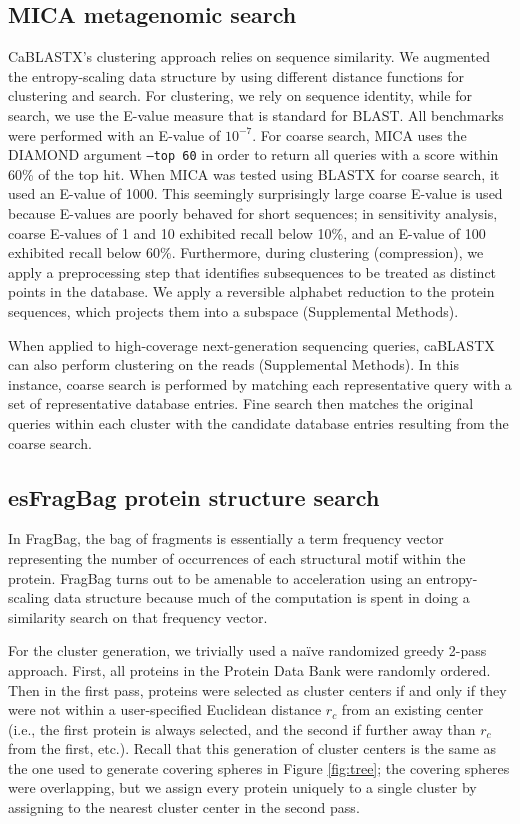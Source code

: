 \documentclass[review,preprint,12pt]{elsarticle}
\theoremstyle{definition}
\theoremstyle{remark}
\numberwithin{equation}{section}
\begin{document}
\subsection{MICA metagenomic search}
CaBLASTX's clustering approach relies on sequence similarity.
We augmented the entropy-scaling data structure by using
different distance functions for clustering and search.
For clustering, we rely on sequence identity, while for search, we use the
E-value measure that is standard for BLAST.
All benchmarks were performed with an E-value of $10^{-7}$. For coarse search, MICA uses the DIAMOND argument \texttt{--top 60} in order to return all queries
with a score within 60\% of the top hit.
When MICA was tested using BLASTX for coarse search, it used an E-value of 
1000.
This seemingly surprisingly large coarse E-value is used because E-values are poorly behaved for short sequences; in sensitivity analysis, coarse E-values of 1 and 10 exhibited recall below 10\%, and an E-value of 100 exhibited recall below 60\%.
Furthermore, during clustering (compression), we apply a preprocessing step that
identifies subsequences to be treated as distinct points in the database.
We apply a reversible alphabet reduction to the
protein sequences, which projects them into a subspace (Supplemental Methods).

When applied to high-coverage next-generation sequencing queries, caBLASTX can also perform clustering on the reads (Supplemental Methods).
In this instance, coarse search is performed by matching each representative query with a set of representative database entries.
Fine search then matches the original queries within each cluster with the candidate database entries resulting from the coarse search.


\subsection{esFragBag protein structure search}
In FragBag, the bag of fragments is essentially
a term frequency vector representing the number of occurrences of each structural motif within the protein.
FragBag turns out to be amenable to acceleration using an entropy-scaling data structure because much of the computation is spent in doing a similarity search on that frequency vector.

For the cluster generation, we trivially used a na\"ive randomized greedy 2-pass approach.
First, all proteins in the Protein Data Bank were randomly ordered.
Then in the first pass, proteins were selected as cluster centers if and only if they were not within a user-specified Euclidean distance $r_c$ from an existing center (i.e., the first protein is always selected, and the second if further away than $r_c$ from the first, etc.).
Recall that this generation of cluster centers is the same as the one used to generate covering spheres in Figure \ref{fig:tree};
the covering spheres were overlapping, but we assign every protein uniquely to a single cluster by assigning to the nearest cluster center in the second pass.
\end{document}
